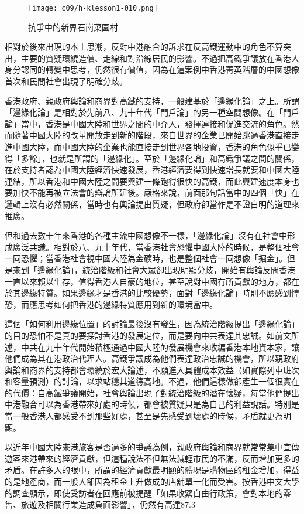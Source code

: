 \begin{figure}[htbp]
    \centering
    \texttt{[image: c09/h-klesson1-010.png]}
    \caption{抗爭中的新界石崗菜園村} 
\end{figure}

相對於後來出現的本土思潮，反對中港融合的訴求在反高鐵運動中的角色不算突出，主要的質疑環繞造價、走線和對沿線居民的影響。不過把高鐵爭議放在香港人身分認同的轉變中思考，仍然很有價值，因為在這案例中香港菁英階層的中國想像首次和民間社會出現了明確分歧。

香港政府、親政府輿論和商界對高鐵的支持，一般建基於「邊緣化論」之上。所謂「邊緣化論」是相對於先前八、九十年代「門戶論」的另一種空間想像。在「門戶論」當中，香港是中國大陸和世界之間的中介人，發揮連接和促進交流的角色。然而隨著中國大陸的改革開放走到新的階段，來自世界的企業已開始跳過香港直接走進中國大陸，而中國大陸的企業也能直接走到世界各地投資，香港的角色似乎已變得「多餘」，也就是所謂的「邊緣化」。至於「邊緣化論」和高鐵爭議之間的關係，在於支持者認為中國大陸經濟快速發展，香港經濟要得到快速增長就要和中國大陸連結，所以香港和中國大陸之間要興建一條跑得很快的高鐵，而此興建速度本身也要加快不能再被立法會的辯論所延後。嚴格來說，前面那句話當中的四個「快」在邏輯上沒有必然關係，當時也有輿論提出質疑，但政府卻當作是不證自明的道理來推廣。

但和過去數十年來香港的各種主流中國想像不一樣，「邊緣化論」沒有在社會中形成廣泛共識。相對於八、九十年代，當香港社會恐懼中國大陸的時候，是整個社會一同恐懼；當香港社會視中國大陸為金礦時，也是整個社會一同想像「掘金」。但是來到「邊緣化論」，統治階級和社會大眾卻出現明顯分歧，開始有輿論反問香港一直以來賴以生存，值得香港人自豪的地位，甚至說對中國有所貢獻的地方，都在於其邊緣特質。如果邊緣才是香港的比較優勢，面對「邊緣化論」時則不應感到惶恐，而應思考如何把香港的邊緣特質應用到新的環境當中。

這個「如何利用邊緣位置」的討論最後沒有發生，因為統治階級提出「邊緣化論」的目的恐怕不是真的要探討香港的發展定位，而是要向中共表達其忠誠。如前文所述，中共在九十年代開始積極通過中國大陸的發展機會來收編香港本地資本家，讓他們成為其在港政治代理人。高鐵爭議成為他們表達政治忠誠的機會，所以親政府輿論和商界的支持都會環繞於宏大論述，不願進入具體成本效益（如實際列車班次和客量預測）的討論，以求站穩其道德高地。不過，他們這樣做卻產生一個很實在的代價：自高鐵爭議開始，社會輿論出現了對統治階級的潛在懷疑，每當他們提出中港融合可以為香港帶來好處的時候，都會被質疑只是為自己的利益說話。特別是當一般香港人都感受不到那些好處，甚至是先感受到壞處的時候，矛盾就更為明顯。

以近年中國大陸來港旅客是否過多的爭議為例，親政府輿論和商界就常常集中宣傳遊客來港帶來的經濟貢獻，但這種說法不但無法減輕市民的不滿，反而增加更多的矛盾。在許多人的眼中，所謂的經濟貢獻最明顯的體現是購物區的租金增加，得益的是地產商，而一般人卻因為租金上升做成的店舖單一化而受害。按香港中文大學的調查顯示，即使受訪者在回應前被提醒「如果收緊自由行政策，會對本地的零售、旅遊及相關行業造成負面影響」，仍然有高達87.3%

